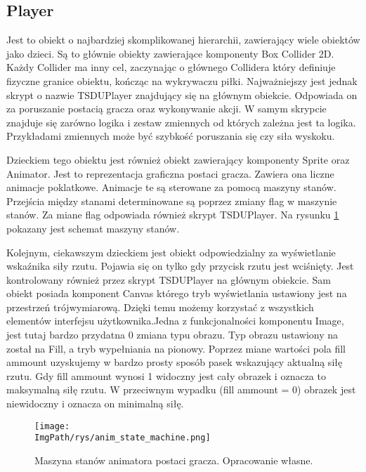\documentclass[a4paper,12pt,twoside,openany]{report}
\newcommand{\ImgPath}{.}
\begin{document}
\subsection{Player}
\label{player}
Jest to obiekt o najbardziej skomplikowanej hierarchii, zawierający wiele obiektów jako dzieci. Są to głównie obiekty zawierające komponenty Box Collider 2D. Każdy Collider ma inny cel, zaczynając o głównego Collidera który definiuje fizyczne granice obiektu, kończąc na wykrywaczu piłki. Najważniejszy jest jednak skrypt o nazwie TSDUPlayer znajdujący się na głównym obiekcie. Odpowiada on za poruszanie postacią gracza oraz wykonywanie akcji. W samym skrypcie znajduje się zarówno logika i zestaw zmiennych od których zależna jest ta logika. Przykładami zmiennych może być szybkość poruszania się czy siła wyskoku.

Dzieckiem tego obiektu jest również obiekt zawierający komponenty Sprite oraz Animator. Jest to reprezentacja graficzna postaci gracza. Zawiera ona liczne animacje poklatkowe. Animacje te są sterowane za pomocą maszyny stanów. Przejścia między stanami determinowane są poprzez zmiany flag w maszynie stanów. Za miane flag odpowiada również skrypt TSDUPlayer. Na rysunku \ref{anim_state_machine} pokazany jest schemat maszyny stanów. 

Kolejnym, ciekawszym dzieckiem jest obiekt odpowiedzialny za wyświetlanie wskaźnika siły rzutu. Pojawia się on tylko gdy przycisk rzutu jest wciśnięty. Jest kontrolowany również przez skrypt TSDUPlayer na głównym obiekcie. Sam obiekt posiada komponent Canvas którego tryb wyświetlania ustawiony jest na przestrzeń trójwymiarową. Dzięki temu możemy korzystać z wszystkich elementów interfejsu użytkownika.Jedna z funkcjonalności komponentu Image, jest tutaj bardzo przydatna 0 zmiana typu obrazu. Typ obrazu ustawiony na został na Fill, a tryb wypełniania na pionowy. Poprzez miane wartości pola fill ammount uzyskujemy w bardzo prosty sposób pasek wskazujący aktualną siłę rzutu. Gdy fill ammount wynosi 1 widoczny jest cały obrazek i oznacza to maksymalną siłę rzutu. W przeciwnym wypadku (fill ammount = 0) obrazek jest niewidoczny i oznacza on minimalną siłę.  

\begin{figure}[H]
	\begin{center}
\centering
\texttt{[image: \\ImgPath/rys/anim\_state\_machine.png]}
\end{center}
	\caption{Maszyna stanów animatora postaci gracza. Opracowanie własne.}
	\label{anim_state_machine}
\end{figure}
\end{document}
